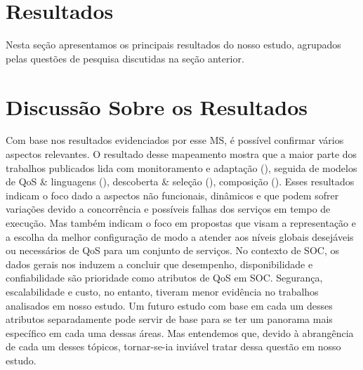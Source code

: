 \section{Resultados}\label{sec:resultados}

Nesta se\c c\~{a}o apresentamos os principais resultados do nosso
estudo, agrupados pelas quest\~{o}es de pesquisa discutidas na se\c
c\~{a}o anterior. 






\section{Discuss\~{a}o Sobre os Resultados}

Com base nos resultados evidenciados por esse MS, \'{e} poss\'{i}vel
confirmar v\'{a}rios aspectos relevantes. O resultado desse mapeamento
mostra que a maior parte dos trabalhos publicados lida com
monitoramento e adapta\c{c}\~{a}o (\MonitoramentoAdaptacao), seguida de modelos de QoS
\& linguagens (\ModelosdeQoSeLinguagens), descoberta \& sele\c{c}\~{a}o (\DescobrimentoeSelecao),
composi\c{c}\~{a}o (\Composicao). Esses resultados indicam o foco dado a aspectos n\~{a}o funcionais, din\^{a}micos e que podem sofrer varia\c{c}\~{o}es devido a concorrência e possíveis falhas dos servi\c{c}os em tempo de execu\c{c}\~{a}o. Mas tamb\'{e}m indicam o foco em propostas que visam a representa\c{c}\~{a}o e a escolha da
melhor configura\c{c}\~{a}o de modo a atender aos níveis globais
desej\'{a}veis ou necess\'{a}rios de QoS para um conjunto de
servi\c{c}os. 
No contexto de SOC, os dados gerais nos induzem a
concluir que desempenho, disponibilidade e confiabilidade s\~{a}o
prioridade como atributos de QoS em SOC. Seguran\c{c}a,
escalabilidade e custo, no entanto, tiveram menor evid\^{e}ncia no trabalhos analisados em nosso estudo. 
Um futuro estudo com base em cada um desses atributos separadamente pode servir de base para se ter um panorama
mais espec\'{i}fico em cada uma dessas \'{a}reas. Mas entendemos que, devido \`{a} abrang\^{e}ncia de cada um desses t\'{o}picos,
tornar-se-ia invi\'{a}vel tratar dessa quest\~{a}o em nosso estudo. 


